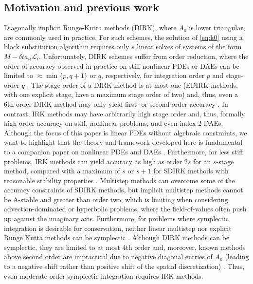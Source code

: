 \documentclass[review]{siamart}
\begin{document}
\subsection{Motivation and previous work}\label{sec:intro:hist}

Diagonally implicit Runge-Kutta methods (DIRK), where $A_0$ is lower triangular,
are commonly used in practice. For such schemes, the solution of \eqref{eq:k0}
using a block substitution algorithm requires only $s$ linear solves of systems
of the form $ M - \delta ta_{ii}\mathcal{L}_i$. Unfortunately, DIRK schemes
suffer from order reduction, where the order of accuracy observed in practice on
stiff nonlinear PDEs or DAEs can be limited to $\approx \min\{ p, q+1\}$ or $q$,
respectively, for integration order $p$ and stage-order $q$
\cite{hairer96,kennedy16}. The stage-order of a DIRK method is at most one
(EDIRK methods, with one explicit stage, have a maximum stage order of two) and,
thus, even a 6th-order DIRK method may only yield first- or second-order
accuracy \cite{butcher00}. In contrast, IRK methods may have arbitrarily high
stage order and, thus, formally high-order accuracy on stiff, nonlinear
problems, and even index-2 DAEs. Although the focus of this paper is linear PDEs
without algebraic constraints, we want to highlight that the theory and
framework developed here is fundamental to a companion paper on nonlinear PDEs
and DAEs \cite{irk2}. Furthermore, for less stiff problems, IRK methods can yield accuracy
as high as order $2s$ for an $s$-stage method, compared with a maximum of $s$ or
$s+1$ for SDIRK methods with reasonable stability properties \cite[Section
IV.6]{hairer96}. Multistep methods can overcome some of the accuracy
constraints of SDIRK methods, but implicit multistep methods cannot be
A-stable and greater than order two, which is limiting when considering
advection-dominated or hyperbolic problems, where the field-of-values often
push up against the imaginary axis. Furthermore, for problems where symplectic
integration is desirable for conservation, neither linear multistep nor explicit
Runge Kutta methods can be symplectic \cite{Hairer.2002}. Although DIRK methods
can be symplectic, they are limited to at most 4th order and, moreover, known
methods above second order are impractical due to negative diagonal entries
of $A_0$ (leading to a negative shift rather than positive shift of the spatial
discretization) \cite{kennedy16}. Thus, even moderate order symplectic
integration requires IRK methods.
\end{document}

